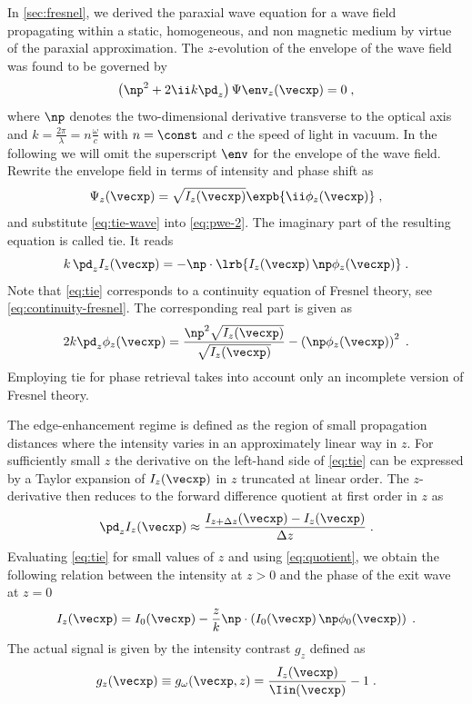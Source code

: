 \documentclass[
twoside,
openright,
titlepage,
numbers=noenddot,
headinclude,
fleqn,
a4paper,
footinclude=true,
cleardoublepage=empty,
abstractoff,
BCOR=5mm,
paper=a4,
fontsize=11pt,
british,ngerman,american,
]{scrreprt}
\begin{document}
In \cref{sec:fresnel}, we derived the paraxial wave equation for a
wave field propagating within a static, homogeneous, and non\hyph
magnetic medium by virtue of the paraxial approximation.  The
$z$-evolution of the envelope of the wave field was found to be
governed by
\begin{equation}
  \label{eq:pwe-2}
  \left(\np^2 +2\ii k\pd_z\right)\Psi\env_{z}(\vecxp) = 0 \;,
\end{equation}
where $\np$ denotes the two-dimensional derivative transverse to the
optical axis and $k=\frac{2\pi}{\lambda}= n \frac{\omega}{c}$ with
$n=\const$ and $c$ the speed of light in vacuum.  In the following we
will omit the superscript $\env$ for the envelope of the wave field.
Rewrite the envelope field in terms of intensity and phase shift as
\begin{equation}
  \label{eq:tie-wave}
  \Psi_{z}(\vecxp)  
  = \sqrt{I_z(\vecxp)}\expb{\ii\phi_z(\vecxp)} \;,
\end{equation}
and substitute \cref{eq:tie-wave} into \cref{eq:pwe-2}.  The imaginary
part of the resulting equation is called \acf{tie}.  It reads
\cite{Teague1983,Rytov1989}
\begin{equation}
  \label{eq:tie}
  k\,\pd_z I_z(\vecxp) =
  -\np\cdot\lrb{I_z(\vecxp)\,\np\phi_z(\vecxp)} \;.
\end{equation}
Note that \cref{eq:tie} corresponds to a continuity equation of
Fresnel theory, see \cref{eq:continuity-fresnel}.  The corresponding
real part is given as
\begin{equation}
  \label{eq:pwe-real-0}
  2k\pd_z\phi_z(\vecxp)=
    \frac{\np^2\sqrt{I_z(\vecxp)}}{\sqrt{I_z(\vecxp)}}
    -\left(\np\phi_z(\vecxp)\right)^2\;.
\end{equation}
Employing \ac{tie} for phase retrieval takes into account only an
incomplete version of Fresnel theory.

The edge-enhancement regime is defined as the region of small
propagation distances where the intensity varies in an approximately
linear way in $z$.  For sufficiently small $z$ the derivative on the
left-hand side of \cref{eq:tie} can be expressed by a Taylor
expansion of $I_z(\vecxp)$ in $z$ truncated at linear order.  The
$z$-derivative then reduces to the forward difference quotient at
first order in $z$ as
\begin{equation}
  \label{eq:quotient}
  \pd_z I_z(\vecxp)\approx 
  \frac{I_{z+\Delta z}(\vecxp)-I_z(\vecxp)}{\Delta z} \;.
\end{equation}
Evaluating  \cref{eq:tie} for small values of $z$
and using \cref{eq:quotient}, we obtain the following relation between
the intensity at $z>0$ and the phase of the exit wave at $z=0$
\begin{equation}
\label{eq:tie-small-z}
  I_z(\vecxp)=I_0(\vecxp)
  -\frac{z}{k}\np\cdot\left(I_0(\vecxp)\,\np\phi_0(\vecxp)\right)\;.
\end{equation}
The actual signal is given by the intensity contrast $g_z$ defined as
\begin{equation}
  \label{eq:g}
   g_z(\vecxp) \equiv  g_\omega(\vecxp,z)
  =\frac{I_z(\vecxp)}{\Iin(\vecxp)}-1 \;.
\end{equation}
\end{document}
